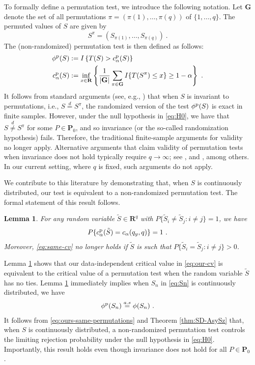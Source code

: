 \documentclass[11pt]{article}
\numberwithin{equation}{section}
\newtheorem{lemma}{Lemma}%
\begin{document}
To formally define a permutation test, we introduce the following notation. Let \(\mathbf{G}\) denote the set of all permutations \(\pi = (\pi(1), \dots, \pi(q))\) of \(\{1, \dots, q\}\). The permuted values of \(S\) are given by
\[
S^{\pi} = (S_{\pi(1)}, \dots, S_{\pi(q)})~.
\]
The (non-randomized) permutation test is then defined as follows:
\begin{align}
    \phi^{\rm p}(S) &:= I\left \{ T(S) > c^{\rm p}_{\alpha}(S) \right \} \notag \\
    c^{\rm p}_{\alpha}(S) &:= \inf_{x \in \mathbf{R}} \left \{ \frac{1}{|\mathbf{G}|} \sum_{\pi \in \mathbf{G}} I\{T(S^{\pi}) \leq x\} \geq 1 - \alpha \right \}~.\label{eq:perm-cv}
\end{align}
It follows from standard arguments (see, e.g., \citet[][Ch.\ 15]{lehmann/romano:05}) that when $S$ is invariant to permutations, i.e., $S \stackrel{d}{=} S^{\pi}$, the randomized version of the test $\phi^{\rm p}(S)$ is exact in finite samples. However, under the null hypothesis in \eqref{eq:H0}, we have that $S \stackrel{d}{\not =} S^{\pi}$ for some $P \in \mathbf{P}_0$, and so invariance (or the so-called randomization hypothesis) fails. Therefore, the traditional finite-sample arguments for validity no longer apply. Alternative arguments that claim validity of permutation tests when invariance does not hold typically require $q \to \infty$; see \cite{chung/romano:13,canay/romano/shaikh:17}, and \cite{bugni/canay/shaikh:18}, among others. In our current setting, where $q$ is fixed, such arguments do not apply.

We contribute to this literature by demonstrating that, when \(S\) is continuously distributed, our test is equivalent to a non-randomized permutation test. The formal statement of this result follows.

\begin{lemma}\label{lem:limit-permutation}
For any random variable $\tilde{S}\in \mathbf{R}^{q}$ with $P\{\tilde{S}_{i}\neq \tilde{S}_{j} : i\not=j\}=1$, we have
\begin{equation}\label{eq:same-cv}
P\{ c_{\alpha }^{\rm p}(\tilde{S}) =c_{\alpha }( q_{y},q)\} =1~.
\end{equation}
Moreover, \eqref{eq:same-cv} no longer holds if $\tilde{S}$ is such that $P\{\tilde{S}_{i}=\tilde{S}_{j}: i\not=j\}>0$.
\end{lemma}

Lemma \ref{lem:limit-permutation} shows that our data-independent critical value in \eqref{eq:our-cv} is equivalent to the critical value of a permutation test when the random variable $\tilde{S}$ has no ties. Lemma \ref{lem:limit-permutation} immediately implies when $S_n$ in \eqref{eq:Sn} is continuously distributed, we have
\begin{equation}\label{eq:ours-same-permutations}
\phi^{\rm p}(S_n) \stackrel{a.s}{=} \phi(S_n)~.
\end{equation}
It follows from \eqref{eq:ours-same-permutations} and Theorem \ref{thm:SD-AsySz} that, when $S$ is continuously distributed, a non-randomized permutation test controls the limiting rejection probability under the null hypothesis in \eqref{eq:H0}. Importantly, this result holds even though invariance does not hold for all $P \in \mathbf{P}_0$.
\end{document}
